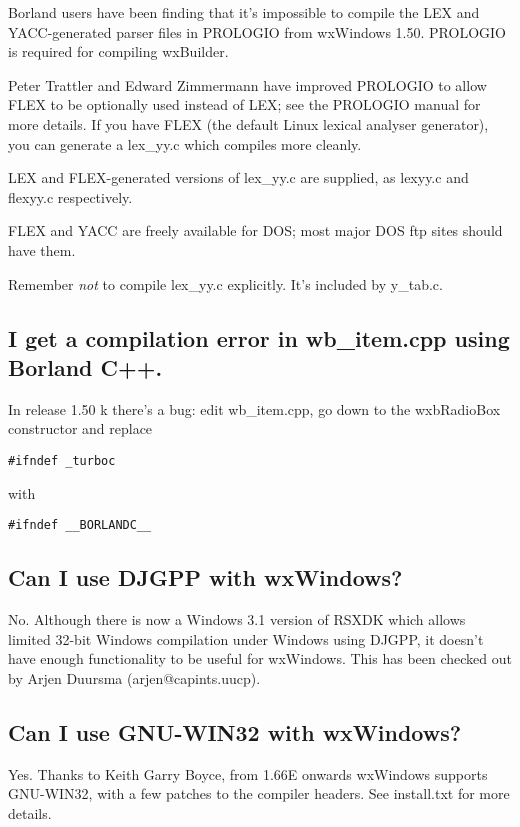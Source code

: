 Borland users have been finding that it's impossible to compile
the LEX and YACC-generated parser files in PROLOGIO from wxWindows
1.50. PROLOGIO is required for compiling wxBuilder.

Peter Trattler and Edward Zimmermann have improved PROLOGIO to allow
FLEX to be optionally used instead of LEX; see the PROLOGIO manual for
more details. If you have FLEX (the default Linux lexical analyser
generator), you can generate a lex\_yy.c which compiles more cleanly.

LEX and FLEX-generated versions of lex\_yy.c are supplied, as
lexyy.c and flexyy.c respectively.

FLEX and YACC are freely available for DOS; most major DOS ftp
sites should have them.

Remember {\it not} to compile lex\_yy.c explicitly. It's included by y\_tab.c.

\subsection{I get a compilation error in wb\_item.cpp using Borland C++.}

In release 1.50 k there's a bug: edit wb\_item.cpp, go down
to the wxbRadioBox constructor and replace

\begin{verbatim}
#ifndef _turboc
\end{verbatim}

with 

\begin{verbatim}
#ifndef __BORLANDC__
\end{verbatim}

\subsection{Can I use DJGPP with wxWindows?}

No. Although there is now a Windows 3.1 version of RSXDK which
allows limited 32-bit Windows compilation under Windows using
DJGPP, it doesn't have enough functionality to be useful for
wxWindows. This has been checked out by Arjen Duursma (arjen@capints.uucp).

\subsection{Can I use GNU-WIN32 with wxWindows?}

Yes. Thanks to Keith Garry Boyce, from 1.66E onwards wxWindows supports
GNU-WIN32, with a few patches to the compiler headers. See install.txt for more
details.

